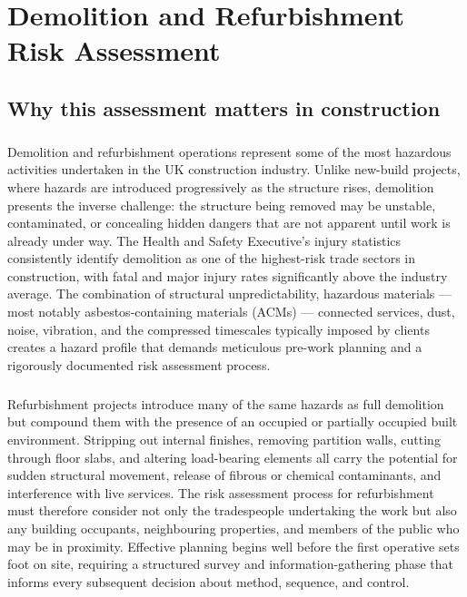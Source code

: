 \chapter{Demolition and Refurbishment Risk Assessment}
\label{chap:Demolition and Refurbishment Risk Assessment}

\section{Why this assessment matters in construction}

\paragraph{}
Demolition and refurbishment operations represent some of the most hazardous activities undertaken in the UK construction industry. Unlike new-build projects, where hazards are introduced progressively as the structure rises, demolition presents the inverse challenge: the structure being removed may be unstable, contaminated, or concealing hidden dangers that are not apparent until work is already under way. The Health and Safety Executive's injury statistics consistently identify demolition as one of the highest-risk trade sectors in construction, with fatal and major injury rates significantly above the industry average. The combination of structural unpredictability, hazardous materials — most notably asbestos-containing materials (ACMs) — connected services, dust, noise, vibration, and the compressed timescales typically imposed by clients creates a hazard profile that demands meticulous pre-work planning and a rigorously documented risk assessment process.

\paragraph{}
Refurbishment projects introduce many of the same hazards as full demolition but compound them with the presence of an occupied or partially occupied built environment. Stripping out internal finishes, removing partition walls, cutting through floor slabs, and altering load-bearing elements all carry the potential for sudden structural movement, release of fibrous or chemical contaminants, and interference with live services. The risk assessment process for refurbishment must therefore consider not only the tradespeople undertaking the work but also any building occupants, neighbouring properties, and members of the public who may be in proximity. Effective planning begins well before the first operative sets foot on site, requiring a structured survey and information-gathering phase that informs every subsequent decision about method, sequence, and control.

